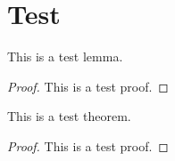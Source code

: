 \chapter{Test}

\begin{lemma}
  \label{LEM.test}
  This is a test lemma.
\end{lemma}

\begin{proof}
  This is a test proof.
\end{proof}

\begin{theorem}
  \label{THE.test}
  This is a test theorem.
\end{theorem}

\begin{proof}
  This is a test proof.
\end{proof}
